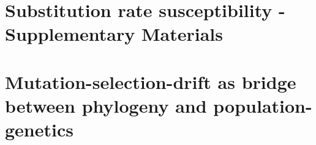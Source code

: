 \documentclass[a4paper,oneside,nobind]{thesis}
\begin{document}
    \thispagestyle{empty}
    \chapter{Substitution rate susceptibility - Supplementary Materials}
    {\hypersetup{linkcolor=GREYDARK}\minitoc}
    \label{chap:GenoPhenoFit-SuppMat}
    

    \chapter*{Mutation-selection-drift as bridge between phylogeny and population-genetics}
    \label{sec-appendix:PRF}
    
    \newpage

    \thispagestyle{empty}
    \label{sec-appendix:MutSelM3starMBE}
    

    \thispagestyle{empty}
    
    
\end{document}
